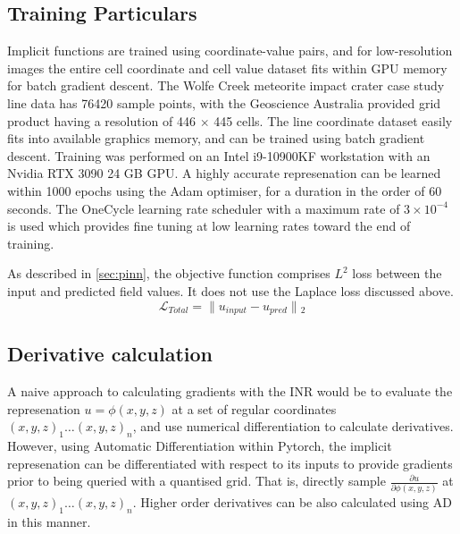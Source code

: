 \documentclass[manuscript.tex]{subfiles}
\begin{document}

\subsection{Training Particulars}
\label{sec:training}

Implicit functions are trained using coordinate-value pairs, and for low-resolution images the entire cell coordinate and cell value dataset fits within GPU memory for batch gradient descent.
The Wolfe Creek meteorite impact crater case study line data has \SI{76420}{} sample points, with the Geoscience Australia provided grid product having a resolution of 446 \(\times{}\) 445 cells.
The line coordinate dataset easily fits into available graphics memory, and can be trained using batch gradient descent.
Training was performed on an Intel i9-10900KF workstation with an Nvidia RTX 3090 24 GB GPU\@.
A highly accurate represenation can be learned within 1000 epochs using the Adam optimiser, for a duration in the order of 60 seconds.
The OneCycle learning rate scheduler \parencite{smithSuperconvergenceVeryFast2018} with a maximum rate of \(3\times{}10^{-4}\) is used which provides fine tuning at low learning rates toward the end of training.

As described in \cref{sec:pinn}, the objective function comprises \(L^2\) loss between the input and predicted field values.
It does not use the Laplace loss discussed above. %
\begin{equation}
    \label{eqn:cri}
    \mathcal{L}_{Total} = \lVert{}u_{input} - u_{pred}\rVert{}_{2} %
\end{equation}

\subsection{Derivative calculation}
A naive approach to calculating gradients with the INR would be to evaluate the represenation \(u = \phi{}(x, y, z)\) at a set of regular coordinates \({(x, y, z)}_1 \dots {(x,y,z)}_n\), and use numerical differentiation to calculate derivatives.
However, using Automatic Differentiation within Pytorch, the implicit represenation can be differentiated with respect to its inputs to provide gradients prior to being queried with a quantised grid.
That is, directly sample \(\frac{\partial{u}}{\partial{\phi{}{(x,y,z)}}}\) at \({(x, y, z)}_1 \dots {(x,y,z)}_n\).
Higher order derivatives can be also calculated using AD in this manner.
\end{document}
